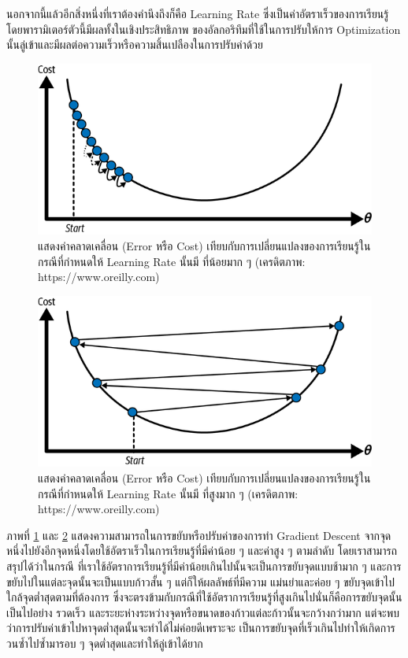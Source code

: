 นอกจากนี้แล้วอีกสิ่งหนึ่งที่เราต้องคำนึงถึงก็คือ Learning Rate ซึ่งเป็นค่าอัตราเร็วของการเรียนรู้ โดยพารามิเตอร์ตัวนี้มีผลทั้งในเชิงประสิทธิภาพ%
ของอัลกอริทึมที่ใช้ในการปรับให้การ Optimization นั้นลู่เข้าและมีผลต่อความเร็วหรือความสิ้นเปลืองในการปรับค่าด้วย

\begin{figure}[H]
    \centering
    \includegraphics[width=0.8\linewidth]{fig/learning_rate_small.png}
    \caption{แสดงค่าคลาดเคลื่อน (Error หรือ Cost) เทียบกับการเปลี่ยนแปลงของการเรียนรู้ในกรณีที่กำหนดให้ Learning Rate นั้นมี%
    ที่น้อยมาก ๆ (เครดิตภาพ: https://www.oreilly.com)}
    \label{fig:learning_rate_small}
\end{figure}

\begin{figure}[H]
    \centering
    \includegraphics[width=0.8\linewidth]{fig/learning_rate_high.png}
    \caption{แสดงค่าคลาดเคลื่อน (Error หรือ Cost) เทียบกับการเปลี่ยนแปลงของการเรียนรู้ในกรณีที่กำหนดให้ Learning Rate นั้นมี%
    ที่สูงมาก ๆ (เครดิตภาพ: https://www.oreilly.com)}
    \label{fig:learning_rate_high}
\end{figure}

ภาพที่ \ref{fig:learning_rate_small} และ \ref{fig:learning_rate_high} แสดงความสามารถในการขยับหรือปรับค่าของการทำ 
Gradient Descent จากจุดหนึ่งไปยังอีกจุดหนึ่งโดยใช้อัตราเร็วในการเรียนรู้ที่มีค่าน้อย ๆ และค่าสูง ๆ ตามลำดับ โดยเราสามารถสรุปได้ว่าในกรณี%
ที่เราใช้อัตราการเรียนรู้ที่มีค่าน้อยเกินไปนั้นจะเป็นการขยับจุดแบบช้ามาก ๆ และการขยับไปในแต่ละจุดนั้นจะเป็นแบบก้าวสั้น ๆ แต่ก็ให้ผลลัพธ์ที่มีความ%
แม่นยำและค่อย ๆ ขยับจุดเข้าไปใกล้จุดต่ำสุดตามที่ต้องการ ซึ่งจะตรงข้ามกับกรณีที่ใช้อัตราการเรียนรู้ที่สูงเกินไปนั่นก็คือการขยับจุดนั้นเป็นไปอย่าง%
รวดเร็ว และระยะห่างระหว่างจุดหรือขนาดของก้าวแต่ละก้าวนั้นจะกว้างกว่ามาก แต่จะพบว่าการปรับค่าเข้าไปหาจุดต่ำสุดนั้นจะทำได้ไม่ค่อยดีเพราะจะ%
เป็นการขยับจุดที่เร็วเกินไปทำให้เกิดการวนซ้ำไปซ้ำมารอบ ๆ จุดต่ำสุดและทำให้ลู่เข้าได้ยาก

